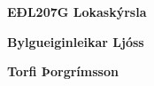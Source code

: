 \documentclass[12pt]{article}
\begin{document}
    
\centerline{\bf \Huge EÐL207G Lokaskýrsla}
\centerline{\bf \large Bylgueiginleikar Ljóss}
\centerline{\bf Torfi Þorgrímsson}

\tableofcontents
\newpage
\end{document}
